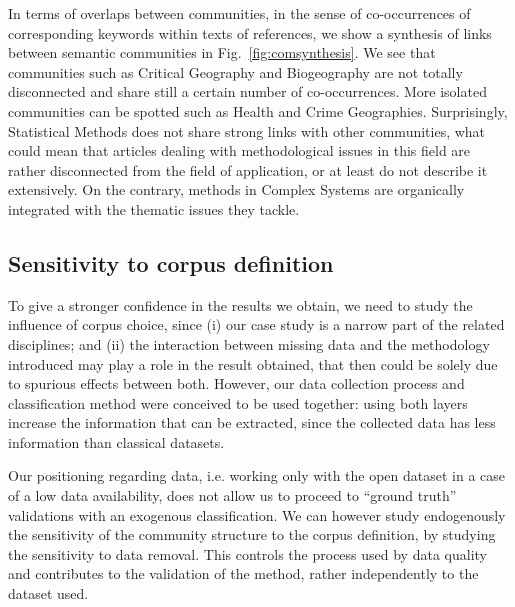 \documentclass[10pt]{article}
\begin{document}
In terms of overlaps between communities, in the sense of co-occurrences of corresponding keywords within texts of references, we show a synthesis of links between semantic communities in Fig.~\ref{fig:comsynthesis}. We see that communities such as Critical Geography and Biogeography are not totally disconnected and share still a certain number of co-occurrences. More isolated communities can be spotted such as Health and Crime Geographies. Surprisingly, Statistical Methods does not share strong links with other communities, what could mean that articles dealing with methodological issues in this field are rather disconnected from the field of application, or at least do not describe it extensively. On the contrary, methods in Complex Systems are organically integrated with the thematic issues they tackle.




\subsection*{Sensitivity to corpus definition}

To give a stronger confidence in the results we obtain, we need to study the influence of corpus choice, since (i) our case study is a narrow part of the related disciplines; and (ii) the interaction between missing data and the methodology introduced may play a role in the result obtained, that then could be solely due to spurious effects between both. However, our data collection process and classification method were conceived to be used together: using both layers increase the information that can be extracted, since the collected data has less information than classical datasets.

Our positioning regarding data, i.e. working only with the open dataset in a case of a low data availability, does not allow us to proceed to ``ground truth'' validations with an exogenous classification. We can however study endogenously the sensitivity of the community structure to the corpus definition, by studying the sensitivity to data removal. This controls the process used by data quality and contributes to the validation of the method, rather independently to the dataset used.
\end{document}
